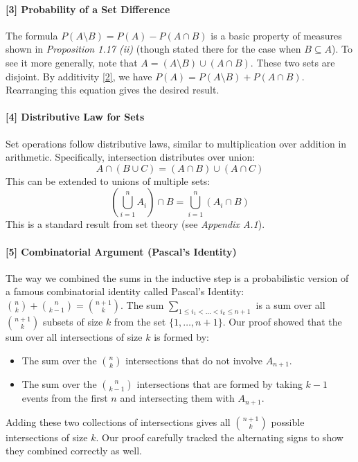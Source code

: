 \documentclass[11pt,a4paper]{article}
\begin{document}
\paragraph{[3] Probability of a Set Difference}
The formula $P(A \setminus B) = P(A) - P(A \cap B)$ is a basic property of measures shown in \textit{Proposition 1.17 (ii)} (though stated there for the case when $B \subseteq A$). To see it more generally, note that $A = (A \setminus B) \cup (A \cap B)$. These two sets are disjoint. By additivity \hyperlink{note:additivity}{[2]}, we have $P(A) = P(A \setminus B) + P(A \cap B)$. Rearranging this equation gives the desired result.

\vspace{1cm}
\hypertarget{note:distributive}{\label{note:distributive}}
\paragraph{[4] Distributive Law for Sets}
Set operations follow distributive laws, similar to multiplication over addition in arithmetic. Specifically, intersection distributes over union:
$$ A \cap (B \cup C) = (A \cap B) \cup (A \cap C) $$
This can be extended to unions of multiple sets:
$$ \left(\bigcup_{i=1}^n A_i\right) \cap B = \bigcup_{i=1}^n (A_i \cap B) $$
This is a standard result from set theory (see \textit{Appendix A.1}).

\vspace{1cm}
\hypertarget{note:pascal}{\label{note:pascal}}
\paragraph{[5] Combinatorial Argument (Pascal's Identity)}
The way we combined the sums in the inductive step is a probabilistic version of a famous combinatorial identity called Pascal's Identity: $\binom{n}{k} + \binom{n}{k-1} = \binom{n+1}{k}$.
The sum $\sum_{1 \le i_1 < \dots < i_k \le n+1}$ is a sum over all $\binom{n+1}{k}$ subsets of size $k$ from the set $\{1, \dots, n+1\}$.
Our proof showed that the sum over all intersections of size $k$ is formed by:
\begin{itemize}
    \item The sum over the $\binom{n}{k}$ intersections that do not involve $A_{n+1}$.
    \item The sum over the $\binom{n}{k-1}$ intersections that are formed by taking $k-1$ events from the first $n$ and intersecting them with $A_{n+1}$.
\end{itemize}
Adding these two collections of intersections gives all $\binom{n+1}{k}$ possible intersections of size $k$. Our proof carefully tracked the alternating signs to show they combined correctly as well.
\end{document}
